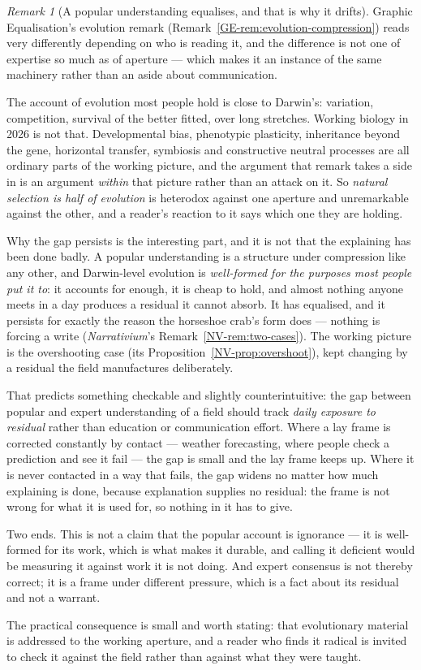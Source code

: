 \documentclass[11pt,a4paper]{article}
\theoremstyle{remark}\newtheorem{remark}[definition]{Remark}
\begin{document}
\begin{remark}[A popular understanding equalises, and that is why it drifts]\label{rem:public-aperture}
Graphic Equalisation's evolution remark (Remark~\ref{GE-rem:evolution-compression}) reads very
differently depending on who is reading it, and the
difference is not one of expertise so much as of aperture --- which makes it an instance of the same
machinery rather than an aside about communication.

The account of evolution most people hold is close to Darwin's: variation, competition, survival of
the better fitted, over long stretches. Working biology in 2026 is not that. Developmental bias,
phenotypic plasticity, inheritance beyond the gene, horizontal transfer, symbiosis and constructive
neutral processes are all ordinary parts of the working picture, and the argument that remark
takes a side in is an argument \emph{within} that picture rather than an attack on it. So
\emph{natural selection is half of evolution} is heterodox against one aperture and unremarkable
against the other, and a reader's reaction to it says which one they are holding.

Why the gap persists is the interesting part, and it is not that the explaining has been done badly.
A popular understanding is a structure under compression like any other, and Darwin-level evolution is
\emph{well-formed for the purposes most people put it to}: it accounts for enough, it is cheap to
hold, and almost nothing anyone meets in a day produces a residual it cannot absorb. It has
equalised, and it persists for exactly the reason the horseshoe crab's form does --- nothing is
forcing a write (\emph{Narrativium}'s Remark~\ref{NV-rem:two-cases}). The working picture is the
overshooting case (its Proposition~\ref{NV-prop:overshoot}), kept changing by a residual the field
manufactures deliberately.

That predicts something checkable and slightly counterintuitive: the gap between popular and expert
understanding of a field should track \emph{daily exposure to residual} rather than education or
communication effort. Where a lay frame is corrected constantly by contact --- weather forecasting,
where people check a prediction and see it fail --- the gap is small and the lay frame keeps up. Where
it is never contacted in a way that fails, the gap widens no matter how much explaining is done,
because explanation supplies no residual: the frame is not wrong for what it is used for, so nothing
in it has to give.

Two ends. This is not a claim that the popular account is ignorance --- it is well-formed for its
work, which is what makes it durable, and calling it deficient would be measuring it against work it
is not doing. And expert consensus is not thereby correct; it is a frame under different pressure,
which is a fact about its residual and not a warrant.

The practical consequence is small and worth stating: that evolutionary material is
addressed to the working aperture, and a reader who finds it radical is invited to check it against
the field rather than against what they were taught.
\end{remark}
\end{document}
